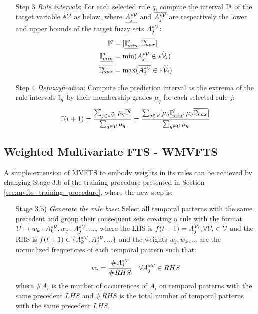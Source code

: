 \begin{enumerate}
\item [Step 3] \textit{Rule intervals}: For each selected rule $q$, compute the interval $\mathbb{I}^q$ of the target variable $*\mathcal{V}$ as below, where $\underline{A_j^{*\mathcal{V}}}$ and $\overline{A_j^{*\mathcal{V}}}$ are respectively the lower and upper bounds of the target fuzzy sets  $A_j^{*\mathcal{V}}$:
\begin{align}
    \mathbb{I}^q & =  [\underline{\mathbb{I}^q_{min}}, \overline{\mathbb{I}^q_{max}}] \\
    \underline{\mathbb{I}^q_{min}} &= \min(\underline{A_j^{*\mathcal{V}}} \in *\widetilde{\mathcal{V}}_i) \\
    \overline{\mathbb{I}^q_{max}} &= \max(\overline{A_j^{*\mathcal{V}}} \in *\widetilde{\mathcal{V}}_i) \\
\end{align}

\item [Step 4] \textit{Defuzzyfication}: Compute the prediction interval as the extrema of the rule intervals $\mathbb{I}_q$ by their membership grades $\mu_q$ for each selected rule $j$:
\begin{equation}
\mathbb{I}(t+1) = \frac{\sum_{j \in *\widetilde{\mathcal{V}}_i} \mu_q \mathbb{I}^q}{\sum_{q \in \mathcal{V}} \mu_q} = \frac{\sum_{q \in \mathcal{V}} [\mu_q\underline{\mathbb{I}^q_{min}} , \mu_q\overline{\mathbb{I}^q_{max}}] }{\sum_{q \in \mathcal{V}} \mu_q}
\label{eqn:mvifts}
\end{equation}
\end{enumerate}

\subsection{Weighted Multivariate FTS - WMVFTS}
\label{sec:wmvfts}

A simple extension of MVFTS to embody weights in its rules can be achieved by changing Stage 3.b of the training procedure presented in Section \ref{sec:mvfts_training_procedure}, where the new step is:

\begin{enumerate}
    \item[Stage 3.b)] \textit{Generate the rule base}: Select all temporal patterns with the same precedent and group their consequent sets  creating a rule with the format $\mathcal{V} \rightarrow w_k \cdot A_k^{*\mathcal{V}}, w_j \cdot A_j^{*\mathcal{V}},...$, where the LHS is $f(t - 1) = A_j^{\mathcal{V}_i}, \forall \mathcal{V}_i \in \mathcal{V}$ and the RHS is $f(t+1) \in \{A_k^{*\mathcal{V}},A_j^{*\mathcal{V}},... \}$ and the weights $w_j, w_k, ...$ are the normalized frequencies of each temporal pattern such that:
\begin{equation}
w_i = \frac{\#A_j^{*\mathcal{V}}}{\#RHS} \quad \forall A_j^{*\mathcal{V}} \in RHS    
\end{equation}
where $\#A_i$ is the number of occurrences of $A_i$ on temporal patterns with the same precedent $LHS$ and $\#RHS$ is the total number of temporal patterns with the same precedent $LHS$.
\end{enumerate}

